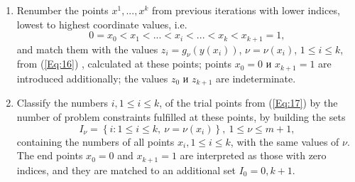 \documentclass{llncs}
\begin{document}
\begin{enumerate}
\item 
Renumber the points $x^1,...,x^k$ from previous iterations with lower indices, lowest to highest coordinate values, i.e.
\begin{equation}\label{Eq:17}
0=x_0<x_1<...<x_i<...<x_k<x_{k+1}=1,
\end{equation}
and match them with the values $z_i=g_\nu(y(x_i))$, $\nu=\nu(x_i)$, $1 \leq i \leq k$, from (\ref{Eq:16}) , calculated at these points; points $x_0=0$ и $x_{k+1}=1$ are introduced additionally; the values $z_0$ и $z_{k+1}$ are indeterminate.
\item
Classify the numbers $i,1\leq i \leq k$, of the trial points from (\ref{Eq:17}) by the number of problem constraints fulfilled at these points, by building the sets
\begin{equation}\label{Eq:18}
I_\nu = \left\{i: 1 \leq i \leq k,\ \nu = \nu(x_i)\right\},\ 1 \leq \nu \leq m+1,
\end{equation}
containing the numbers of all points $x_i,1\leq i \leq k$, with the same values of $\nu$. The end points $x_0=0$ and $x_{k+1}=1$ are interpreted as those with zero indices, and they are matched to an additional set $I_0={0,k+1}$. 


\end{enumerate}
\end{document}
